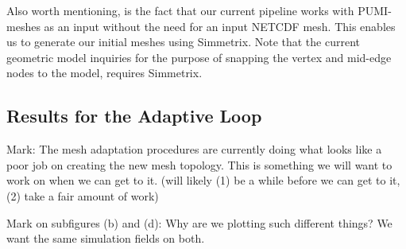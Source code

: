 \documentclass[review,12pt]{elsarticle_summary_report}
\begin{document}
Also worth mentioning, is the fact that our current pipeline works with PUMI-meshes as an input without the need for an input NETCDF mesh. This enables us to generate our initial meshes using Simmetrix. Note that the current geometric model inquiries for the purpose of snapping the vertex and mid-edge nodes to the model, requires Simmetrix.

\subsection{Results for the Adaptive Loop}

\color{blue} Mark: The mesh adaptation procedures are currently doing what looks like a poor job on creating the new mesh topology. This is something we will want to work on when we can get to it. (will likely (1) be a while before we can get to it, (2) take a fair amount of work) \color{black}

\color{blue} Mark on subfigures (b) and (d): Why are we plotting such different things? We want the same simulation fields on both. \color{black}
\end{document}
